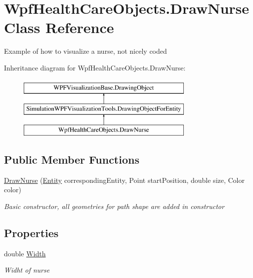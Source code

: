 \hypertarget{class_wpf_health_care_objects_1_1_draw_nurse}{}\section{Wpf\+Health\+Care\+Objects.\+Draw\+Nurse Class Reference}
\label{class_wpf_health_care_objects_1_1_draw_nurse}


Example of how to visualize a nurse, not nicely coded  


Inheritance diagram for Wpf\+Health\+Care\+Objects.\+Draw\+Nurse\+:\begin{figure}[H]
\begin{center}
\leavevmode
\includegraphics[height=3.000000cm]{class_wpf_health_care_objects_1_1_draw_nurse}
\end{center}
\end{figure}
\subsection*{Public Member Functions}
\begin{DoxyCompactItemize}
\item 
\hyperlink{class_wpf_health_care_objects_1_1_draw_nurse_ad89b3a764feb4ff03972ced4b20789dc}{Draw\+Nurse} (\hyperlink{class_simulation_core_1_1_h_c_c_m_elements_1_1_entity}{Entity} corresponding\+Entity, Point start\+Position, double size, Color color)
\begin{DoxyCompactList}\small\item\em Basic constructor, all geometries for path shape are added in constructor \end{DoxyCompactList}\end{DoxyCompactItemize}
\subsection*{Properties}
\begin{DoxyCompactItemize}
\item 
double \hyperlink{class_wpf_health_care_objects_1_1_draw_nurse_a8a916f75d3d93525ac2889a720b8004c}{Width}
\begin{DoxyCompactList}\small\item\em Widht of nurse \end{DoxyCompactList}\end{DoxyCompactItemize}
